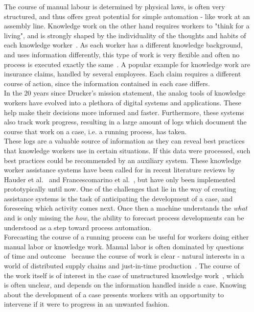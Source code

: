 The course of manual labour is determined by physical laws, is often very structured, and thus offers great potential for simple automation - like work at an assembly line. Knowledge work on the other hand requires workers to "think for a living", and is strongly shaped by the individuality of the thoughts and habits of each knowledge worker~\cite{drucker1999}. As each worker has a different knowledge background, and uses information differently, this type of work is very flexible and often no process is executed exactly the same~\cite{hewelt2016}. A popular example for knowledge work are insurance claims, handled by several employees. Each claim requires a different course of action, since the information contained in each case differs.\\

In the 20 years since Drucker's mission statement, the analog tools of knowledge workers have evolved into a plethora of digital systems and applications. These help make their decisions more informed and faster. Furthermore, these systems also track work progress, resulting in a large amount of logs which document the course that work on a case, i.e. a running process, has taken.\\

These logs are a valuable source of information as they can reveal best practices that knowledge workers use in certain situations. If this data were processed, such best practices could be recommended by an auxiliary system. These knowledge worker assistance systems have been called for in recent literature reviews by Hauder et al.~\cite{hauder2014} and Francescomarino et al.~\cite{francescomarino2018}, but have only been implemented prototypically until now. One of the challenges that lie in the way of creating assistance systems is the task of anticipating the development of a case, and foreseeing which activity comes next. Once then a machine understands the \textit{what} and is only missing the \textit{how}, the ability to forecast process developments can be understood as a step toward process automation.\\

Forecasting the course of a running process can be useful for workers doing either manual labor or knowledge work. Manual labor is often dominated by questions of time and outcome~\cite{rogge2013} because the course of work is clear - natural interests in a world of distributed supply chains and just-in-time production~\cite{web:economist:jit}. The course of the work itself is of interest in the case of unstructured knowledge work~\cite{francescomarino2015}, which is  often unclear, and depends on the information handled inside a case. Knowing about the development of a case presents workers with an opportunity to intervene if it were to progress in an unwanted fashion.\\

